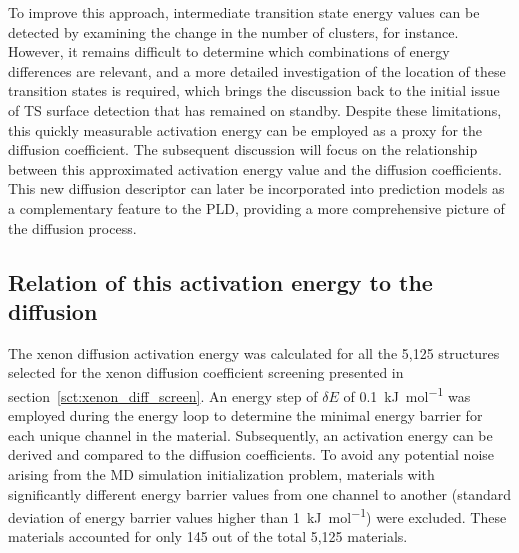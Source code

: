 \documentclass[main]{subfiles}
\begin{document}
To improve this approach, intermediate transition state energy values can be detected by examining the change in the number of clusters, for instance. However, it remains difficult to determine which combinations of energy differences are relevant, and a more detailed investigation of the location of these transition states is required, which brings the discussion back to the initial issue of TS surface detection that has remained on standby. Despite these limitations, this quickly measurable activation energy can be employed as a proxy for the diffusion coefficient.
The subsequent discussion will focus on the relationship between this approximated activation energy value and the diffusion coefficients. This new diffusion descriptor can later be incorporated into prediction models as a complementary feature to the PLD, providing a more comprehensive picture of the diffusion process.

\subsection{Relation of this activation energy to the diffusion}

The xenon diffusion activation energy was calculated for all the 5,125 structures selected for the xenon diffusion coefficient screening presented in section~\ref{sct:xenon_diff_screen}. An energy step of $\delta E$ of \SI{0.1}{\kJ\per\mol} was employed during the energy loop to determine the minimal energy barrier for each unique channel in the material. Subsequently, an activation energy can be derived and compared to the diffusion coefficients. To avoid any potential noise arising from the MD simulation initialization problem, materials with significantly different energy barrier values from one channel to another (standard deviation of energy barrier values higher than \SI{1}{\kJ\per\mol}) were excluded. These materials accounted for only 145 out of the total 5,125 materials.
\end{document}
